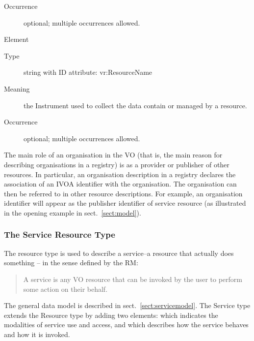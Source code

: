 \documentclass[11pt,a4paper]{ivoa}
\begin{document}
\begin{generated}
\begin{bigdescription}
\begin{description}
\item[Occurrence] optional; multiple occurrences allowed.

\end{description}
\item[Element \xmlel{instrument}]
\begin{description}
\item[Type] string with ID attribute: vr:ResourceName
\item[Meaning] 
                       the Instrument used to collect the data contain or 
                       managed by a resource.  
                     
\item[Occurrence] optional; multiple occurrences allowed.

\end{description}


\end{bigdescription}\endgroup

\endgroup
\end{generated}


The main role of an organisation in the VO (that is, the main reason
for describing organisations in a registry) is as a provider or
publisher of other resources.  In particular, an organisation
description in a registry declares the association of an IVOA
identifier with the organisation.  The
organisation can then be referred to in other resource descriptions.
For example, an organisation identifier will appear as the publisher
identifier of service resource (as illustrated in the opening
example in sect.~\ref{sect:model}).


\subsubsection{The Service Resource Type}


The  resource type is used to describe a service--a resource
that actually does something -- in the sense defined by the
RM:

\begin{quotation}
A service is any VO resource that can be invoked by the user to
perform some action on their behalf.  
\end{quotation}


The general data model is described in sect.~\ref{sect:servicemodel}.
The Service type extends the Resource type by adding two elements:
 which indicates the modalities of service use and access, and
 which describes how the service behaves and how it is
invoked.
\end{document}
